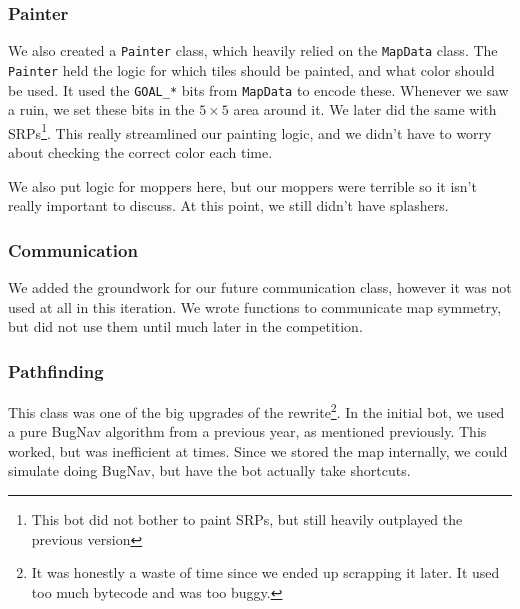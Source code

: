 \subsubsection{Painter}

We also created a \verb|Painter| class, which heavily relied on the \verb|MapData| class. The \verb|Painter| held the logic for which tiles should be painted, and what color should be used. It used the \verb|GOAL_*| bits from \verb|MapData| to encode these. Whenever we saw a ruin, we set these bits in the $5 \times 5$ area around it. We later did the same with SRPs\footnote{This bot did not bother to paint SRPs, but still heavily outplayed the previous version}. This really streamlined our painting logic, and we didn't have to worry about checking the correct color each time.

\medskip

We also put logic for moppers here, but our moppers were terrible so it isn't really important to discuss. At this point, we still didn't have splashers.

\subsubsection{Communication}

We added the groundwork for our future communication class, however it was not used at all in this iteration. We wrote functions to communicate map symmetry, but did not use them until much later in the competition.

\subsubsection{Pathfinding}

This class was one of the big upgrades of the rewrite\footnote{It was honestly a waste of time since we ended up scrapping it later. It used too much bytecode and was too buggy.}. In the initial bot, we used a pure BugNav algorithm from a previous year, as mentioned previously. This worked, but was inefficient at times. Since we stored the map internally, we could simulate doing BugNav, but have the bot actually take shortcuts.

\medskip

